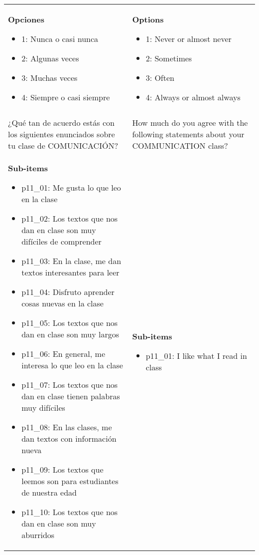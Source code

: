 \documentclass[11pt]{article}
\begin{document}
\begin{longtable}{@{}LL@{}}
\textbf{Opciones}\par\begin{itemize}[leftmargin=*]\item 1: Nunca o casi nunca
\item 2: Algunas veces
\item 3: Muchas veces
\item 4: Siempre o casi siempre\end{itemize} & \textbf{Options}\par\begin{itemize}[leftmargin=*]\item 1: Never or almost never
\item 2: Sometimes
\item 3: Often
\item 4: Always or almost always\end{itemize} \\
\addlinespace[4pt]
 \\ 
¿Qué tan de acuerdo estás con los siguientes enunciados sobre tu clase de COMUNICACIÓN? & How much do you agree with the following statements about your COMMUNICATION class? \\
\textbf{Sub-items}\par\begin{itemize}[leftmargin=*]\item p11\_01: Me gusta lo que leo en la clase
\item p11\_02: Los textos que nos dan en clase son muy difíciles de comprender
\item p11\_03: En la clase, me dan textos interesantes para leer
\item p11\_04: Disfruto aprender cosas nuevas en la clase
\item p11\_05: Los textos que nos dan en clase son muy largos
\item p11\_06: En general, me interesa lo que leo en la clase
\item p11\_07: Los textos que nos dan en clase tienen palabras muy difíciles
\item p11\_08: En las clases, me dan textos con información nueva
\item p11\_09: Los textos que leemos son para estudiantes de nuestra edad
\item p11\_10: Los textos que nos dan en clase son muy aburridos\end{itemize} & \textbf{Sub-items}\par\begin{itemize}[leftmargin=*]\item p11\_01: I like what I read in class

\end{itemize}
\end{longtable}
\end{document}
